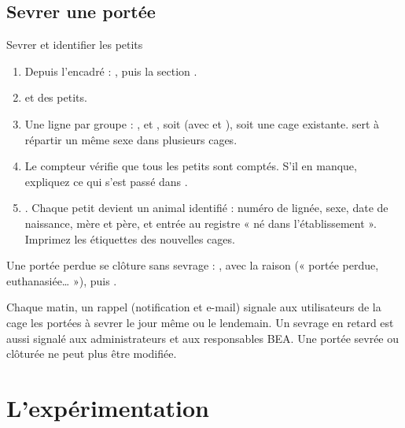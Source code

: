 \documentclass[11pt,a4paper]{article}
\begin{document}
\subsection{Sevrer une portée}
\begin{procedure}{Sevrer et identifier les petits}
\begin{enumerate}
  \item Depuis l'encadré  : , puis la section .
  \item {} et  des petits.
  \item Une ligne par groupe : ,  et
    , soit  (avec
     et ), soit une cage existante.  sert à répartir un même sexe
    dans plusieurs cages.
  \item Le compteur  vérifie que tous les petits
    sont comptés. S'il en manque, expliquez ce qui s'est passé dans
    .
  \item {}. Chaque petit devient un animal identifié :
    numéro de lignée, sexe, date de naissance, mère et père, et entrée au
    registre « né dans l'établissement ». Imprimez les étiquettes des
    nouvelles cages.
\end{enumerate}
\end{procedure}

Une portée perdue se clôture sans sevrage : , avec la raison (« portée perdue, euthanasiée… »), puis
.

\begin{regle}
Chaque matin, un rappel (notification et e-mail) signale aux utilisateurs de
la cage les portées à sevrer le jour même ou le lendemain. Un sevrage en
retard est aussi signalé aux administrateurs et aux responsables BEA. Une
portée sevrée ou clôturée ne peut plus être modifiée.
\end{regle}

\section{L'expérimentation}\label{sec:experimentation}
\end{document}
